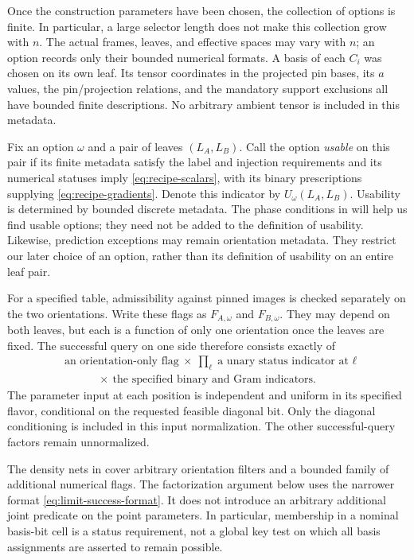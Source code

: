 Once the construction parameters have been chosen, the collection of
options is finite. In particular, a large selector length does not make
this collection grow with $n$. The actual frames, leaves, and effective
spaces may vary with $n$; an option records only their bounded numerical
formats. A basis of each $C_i$ was chosen on its own leaf. Its tensor
coordinates in the projected pin bases, its $a$ values, the
pin/projection relations, and the mandatory support exclusions all have
bounded finite descriptions. No arbitrary ambient tensor is included in
this metadata.

Fix an option $\omega$ and a pair of leaves $(L_A,L_B)$. Call the option
\emph{usable} on this pair if its finite metadata satisfy the label and
injection requirements and its numerical statuses imply
\eqref{eq:recipe-scalars}, with its binary prescriptions supplying
\eqref{eq:recipe-gradients}. Denote this indicator by
$U_\omega(L_A,L_B)$. Usability is determined by bounded discrete metadata.
The phase conditions in  will help us find
usable options; they need not be added to the definition of usability.
Likewise, prediction exceptions may remain orientation metadata. They
restrict our later choice of an option, rather than its definition of
usability on an entire leaf pair.

For a specified table, admissibility against pinned images is checked
separately on the two orientations. Write these flags as
$F_{A,\omega}$ and $F_{B,\omega}$. They may depend on both leaves, but
each is a function of only one orientation once the leaves are fixed.
The successful query on one side therefore consists exactly of
\begin{equation}
\label{eq:limit-success-format}
\begin{aligned}
&\text{an orientation-only flag}\ \times\
  \prod_{\ell}\text{a unary status indicator at $\ell$}\\
&\hspace{3em}\times\ \text{the specified binary and Gram indicators}.
\end{aligned}
\end{equation}
The parameter input at each position is independent and uniform in its
specified flavor, conditional on the requested feasible diagonal bit.
Only the diagonal conditioning is included in this input normalization.
The other successful-query factors remain unnormalized.

\begin{remark}
\label{rem:limit-filter-boundary}
The density nets in  cover arbitrary
orientation filters and a bounded family of additional numerical flags.
The factorization argument below uses the narrower format
\eqref{eq:limit-success-format}. It does not introduce an arbitrary
additional joint predicate on the point parameters. In particular,
membership in a nominal basis-bit cell is a status requirement, not a
global key test on which all basis assignments are asserted to remain
possible.
\end{remark}

